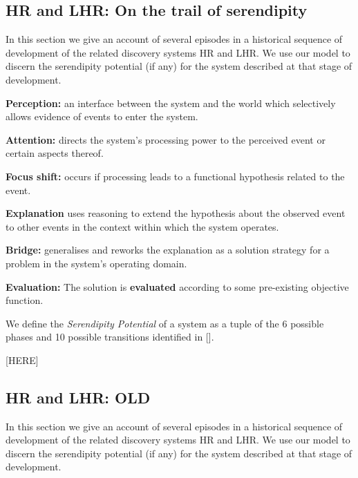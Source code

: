 

\subsection{{\sf HR} and {\sf LHR}: On the trail of serendipity} \label{sec:pursuit}
In this section we give an account of several episodes in a historical sequence of development of the related discovery systems {\sf HR} and {\sf LHR}. We use our model to discern the serendipity potential (if any) for the system described at that stage of development.

{\bf Perception:} an interface between the system and the world which selectively allows
evidence of events to enter the system.

{\bf Attention:} directs the system’s processing power to the perceived event or certain aspects
thereof.

{\bf Focus shift:} occurs if processing leads to a functional hypothesis related to the event.

{\bf Explanation} uses reasoning to extend the hypothesis about the observed event to other
events in the context within which the system operates.

{\bf Bridge:}  generalises and reworks
the explanation as a solution strategy for a problem in the system's
operating domain.

{\bf Evaluation:} The solution is
\textbf{evaluated} according to some pre-existing objective function.

We define the {\em Serendipity Potential} of a system as a tuple of the 6 possible phases and 10 possible transitions identified in []. 




[HERE]
\subsection{{\sf HR} and {\sf LHR}: OLD}
In this section we give an account of several episodes in a historical sequence of development of the related discovery systems {\sf HR} and {\sf LHR}. We use our model to discern the serendipity potential (if any) for the system described at that stage of development.


